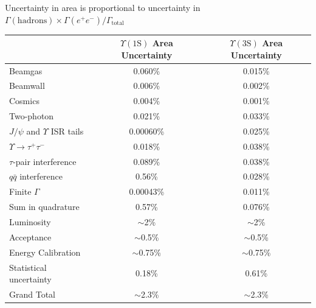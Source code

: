 \begin{slide*}

\slideframe{}
\huge
{}

\begin{minipage}[t]{\linewidth}
\large

Uncertainty in area is proportional to uncertainty in
$\Gamma(\mbox{hadrons}) \times \Gamma(e^+ e^-)/\Gamma_{\mbox{total}}$

\vspace{0.5cm}

\begin{center}
  \begin{tabular}{l c c}
    & $\Upsilon(\mbox{1S})$ Area Uncertainty & $\Upsilon(\mbox{3S})$ Area Uncertainty \\\hline

    Beamgas  			      & 0.060\%   & 0.015\% \\
    Beamwall 			      & 0.006\%   & 0.002\% \\
    Cosmics  			      & 0.004\%   & 0.001\% \\
    Two-photon                        & 0.021\%   & 0.033\% \\
    $J/\psi$ and $\Upsilon$ ISR tails & 0.00060\% & 0.025\% \\
    $\Upsilon \to \tau^+ \tau^-$      & 0.018\%   & 0.038\% \\
    $\tau$-pair interference 	      & 0.089\%   & 0.038\% \\
    $q\bar{q}$ interference  	      & 0.56\%    & 0.028\% \\
    Finite $\Gamma$          	      & 0.00043\% & 0.011\% \\\hline
    Sum in quadrature        	      & 0.57\%    & 0.076\% \vspace{0.5cm}\\

    Luminosity                        & $\sim$2\%    & $\sim$2\%    \\
    Acceptance                        & $\sim$0.5\%  & $\sim$0.5\%  \\
    Energy Calibration                & $\sim$0.75\% & $\sim$0.75\% \vspace{0.5cm}\\

    Statistical uncertainty           & 0.18\%       & 0.61\% \\\hline
    Grand Total                       & $\sim$2.3\%  & $\sim$2.3\%  \vspace{0.5cm}\\


\end{tabular}
\end{center}
\end{minipage}
\end{slide*}
